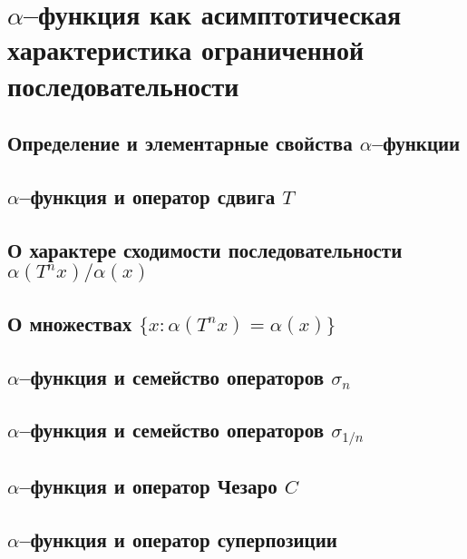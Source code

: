 \documentclass[12pt,a4paper,openbib]{report}
\theoremstyle{definition}
\begin{document}
\chapter{$\alpha$--функция как асимптотическая характеристика ограниченной последовательности}

	\section{Определение и элементарные свойства $\alpha$--функции}
	

	\section{$\alpha$--функция и оператор сдвига $T$}
	

	\section{О характере сходимости последовательности $\alpha(T^n x)/ \alpha(x)$}
	

	\section{О множествах $\{x: \alpha(T^n x) = \alpha(x)\}$}
	

	\section{$\alpha$--функция и семейство операторов $\sigma_n$}
	

	\section{$\alpha$--функция и семейство операторов $\sigma_{1/n}$}
	

	\section{$\alpha$--функция и оператор Чезаро $C$}
	

	\section{$\alpha$--функция и оператор суперпозиции}
	
\end{document}
